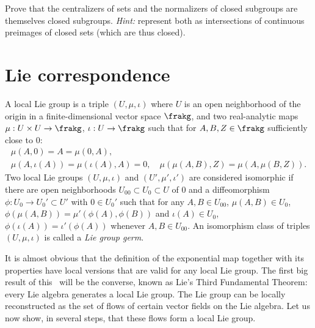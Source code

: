 \begin{xca}\label{xca normalizer is closed}
    Prove that the centralizers of sets and the normalizers of closed subgroups are themselves closed subgroups. \emph{Hint:} represent both as intersections of continuous preimages of closed sets (which are thus closed). 
\end{xca}



\section{Lie correspondence}\label{sec: Lie III}

\begin{defn}
    A local Lie group is a triple $(U,\mu,\iota)$ where $U$ is an open neighborhood of the origin in a finite-dimensional vector space $\frakg$, and two real-analytic maps $\mu:U\times U\to\frakg$, $\iota:U\to\frakg$ such that for $A,B,Z\in\frakg$ sufficiently close to $0$:
    \begin{gather}
        \mu(A,0)=A=\mu(0,A),\\
        \mu(A,\iota(A))=\mu(\iota(A),A)=0,\quad \mu(\mu(A,B),Z)=\mu(A,\mu(B,Z)).
    \end{gather}
    Two local Lie groups $(U,\mu,\iota)$ and $(U',\mu',\iota')$ are considered isomorphic if there are open neighborhoods $U_{00}\subset U_0\subset U$ of $0$ and a diffeomorphism $\phi:U_0\to U_0'\subset U'$ with $0\in U_0'$ such that for any $A,B\in U_{00}$, $\mu(A,B)\in U_0$, $\phi(\mu(A,B))=\mu'(\phi(A),\phi(B))$ and $\iota(A)\in U_0$, $\phi(\iota(A))=\iota'(\phi(A))$ whenever $A,B\in U_{00}$. An isomorphism class of triples $(U,\mu,\iota)$ is called a \emph{Lie group germ}.
\end{defn}

It is almost obvious that the definition of the exponential map together with its properties have local versions that are valid for any local Lie group. The first big result of this \sect\ will be the converse, known as Lie's Third Fundamental Theorem: every Lie algebra generates a local Lie group. The Lie group can be locally reconstructed as the set of flows of certain vector fields on the Lie algebra. Let us now show, in several steps, that these flows form a local Lie group.

